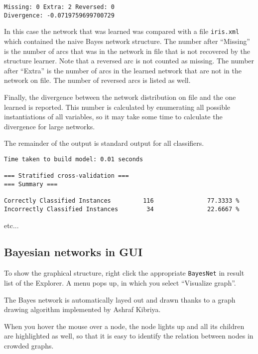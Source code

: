 \begin{verbatim}
Missing: 0 Extra: 2 Reversed: 0
Divergence: -0.0719759699700729
\end{verbatim}

In this case the network that was learned was compared with a file {\tt iris.xml}
which contained the naive Bayes network structure. The number after ``Missing''
is the number of arcs that was in the network in file that is not recovered by
the structure learner. Note that a reversed arc is not counted as missing.
The number after ``Extra'' is the number of arcs in the learned network that are
not in the network on file. The number of reversed arcs is listed as well.

Finally, the divergence between the network distribution on file and the one learned
is reported. This number is calculated by enumerating all possible instantiations
of all variables, so it may take some time to calculate the divergence for large
networks.

The remainder of the output is standard output for all classifiers. 
\begin{verbatim}
Time taken to build model: 0.01 seconds

=== Stratified cross-validation ===
=== Summary ===

Correctly Classified Instances         116               77.3333 %
Incorrectly Classified Instances        34               22.6667 %
\end{verbatim}
etc...

\subsection*{Bayesian networks in GUI}

To show the graphical structure, right click the appropriate \texttt{BayesNet} in result list of
the Explorer. A menu pops up, in which you select ``Visualize graph''.

\begin{center}
\end{center}

The Bayes network is automatically layed out and drawn thanks to a graph drawing algorithm
implemented by Ashraf Kibriya.

\begin{center}
\end{center}

When you hover the mouse over a node, the node lights up and all its children are highlighted
as well, so that it is easy to identify the relation between nodes in crowded graphs.

